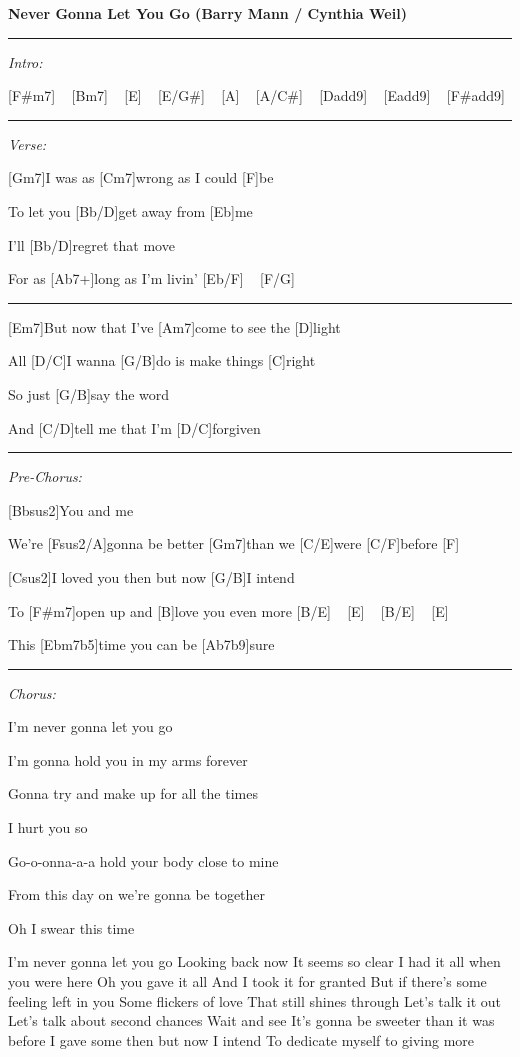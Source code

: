 \documentclass{article}
\begin{document}
\begin{guitar}
\textbf{Never Gonna Let You Go (Barry Mann / Cynthia Weil)}

\hrule

\emph{Intro:}

[F#m7] ~ [Bm7] ~ [E] ~ [E/G#] ~ [A] ~ [A/C#] ~ [Dadd9] ~ [Eadd9] ~ [F#add9]

\hrule

\emph{Verse:}

[Gm7]I was as [Cm7]wrong as I could [F]be

To let you [Bb/D]get away from [Eb]me

I'll [Bb/D]regret that move

For as [Ab7+]long as I'm livin' [Eb/F] ~ [F/G] ~

\hrule

[Em7]But now that I've [Am7]come to see the [D]light

All [D/C]I wanna [G/B]do is make things [C]right

So just [G/B]say the word

And [C/D]tell me that I'm [D/C]forgiven

\hrule

\emph{Pre-Chorus:}

[Bbsus2]You and me

We're [Fsus2/A]gonna be better [Gm7]than we [C/E]were [C/F]before [F] ~

[Csus2]I loved you then but now [G/B]I intend

To [F#m7]open up and [B]love you even more [B/E] ~ [E] ~ [B/E] ~ [E] ~

This [Ebm7b5]time you can be [Ab7b9]sure

\hrule

\emph{Chorus:}

I'm never gonna let you go

I'm gonna hold you in  my arms forever

Gonna try and make up for all the times

I hurt you so

Go-o-onna-a-a hold your body close to mine

From this day on we're gonna be together

Oh I swear this time

I'm never gonna let you go
Looking back now  It seems so clear
I had it all when you were here
Oh you gave it all
And I took it for granted
But if there's some feeling left in you
Some flickers of love
That still shines through
Let's talk it out
Let's talk about second chances
Wait and see
It's gonna be sweeter than it was   before
I gave some then but now I intend
To dedicate myself to giving more


\end{guitar}
\end{document}
